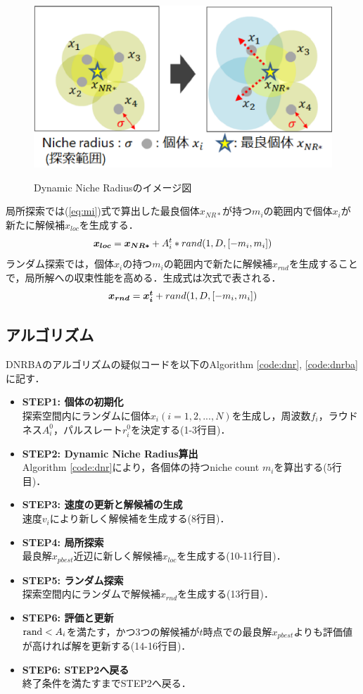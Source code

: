 \documentclass[a4j,11pt]{jarticle}
\begin{document}
\begin{figure}[h]
\centering
\includegraphics[width=0.7\linewidth]{eps/dynamic_niche_radius.eps}
\label{fig:dnr}
\caption{Dynamic Niche Radiusのイメージ図}
\end{figure}

局所探索では(\ref{eq:mi})式で算出した最良個体$x_{NR*}$が持つ$m_i$の範囲内で個体$x_i$が新たに解候補$x_{loc}$を生成する．
\begin{equation}
\label{eq:dnrloc}
\mbox{\boldmath $x_{loc}$}=\mbox{\boldmath $x_{NR*}$} + A_i^t*rand(1,D,[-m_i, m_i])
\end{equation}
ランダム探索では，個体$x_i$の持つ$m_i$の範囲内で新たに解候補$x_{rnd}$を生成することで，局所解への収束性能を高める．生成式は次式で表される．
\begin{equation}
\label{eq:dnrrnd}
\mbox{\boldmath $x_{rnd}$}=\mbox{\boldmath $x_i^t$} + rand(1,D,[-m_i, m_i])
\end{equation}

\subsection{アルゴリズム}
\label{sss:DNRBA-algorithm}
DNRBAのアルゴリズムの疑似コードを以下のAlgorithm \ref{code:dnr}, \ref{code:dnrba}に記す．

\begin{itemize}
\item {\bf STEP1: 個体の初期化}\\
探索空間内にランダムに個体$x_i (i=1,2,...,N)$を生成し，周波数$f_i$，ラウドネス$A_i^0$，パルスレート$r_i^0$を決定する(1-3行目)．
\item {\bf STEP2: Dynamic Niche Radius算出}\\
Algorithm \ref{code:dnr}により，各個体の持つniche count $m_i$を算出する(5行目)．
\item {\bf STEP3: 速度の更新と解候補の生成}\\
速度$v_i$により新しく解候補を生成する(8行目)．
\item {\bf STEP4: 局所探索}\\
最良解$x_{pbest}$近辺に新しく解候補$x_{loc}$を生成する(10-11行目)．
\item {\bf STEP5: ランダム探索}\\
探索空間内にランダムで解候補$x_{rnd}$を生成する(13行目)．
\item {\bf STEP6: 評価と更新}\\
${\rm rand} < A_i$を満たす，かつ3つの解候補が$t$時点での最良解$x_{pbest}$よりも評価値が高ければ解を更新する(14-16行目)．
\item {\bf STEP6: STEP2へ戻る}\\
終了条件を満たすまでSTEP2へ戻る．
\end{itemize}
\end{document}
